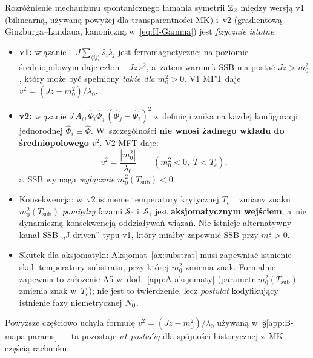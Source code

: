 \begin{remark}
\label{rem:B-ssb-v2}
Rozr\'o\.znienie mechanizmu spontanicznego \l{}amania symetrii
$\mathbb{Z}_2$ mi\k{e}dzy wersj\k{a} v1 (bilinearn\k{a}, u\.zywan\k{a}
powy\.zej dla transparentno\'sci MK) i~v2 (gradientow\k{a}
Ginzburga--Landaua, kanoniczn\k{a} w~\eqref{eq:H-Gamma}) jest
\emph{fizycznie istotne}:
\begin{itemize}[nosep]
  \item \textbf{v1:} wi\k{a}zanie $-J\sum_{\langle ij\rangle}
    \hat{s}_i\hat{s}_j$ jest ferromagnetyczne; na poziomie
    \'sredniopolowym daje cz\l{}on $-Jz\,s^2$, a~zatem warunek
    SSB ma posta\'c $Jz > m_0^2$, kt\'ory mo\.ze by\'c
    spe\l{}niony \emph{tak\.ze dla} $m_0^2 > 0$. V1 MFT
    daje $v^2 = (Jz - m_0^2)/\lambda_0$.
  \item \textbf{v2:} wi\k{a}zanie $J\,A_{ij}\,\hat{\Phi}_i
    \hat{\Phi}_j\,(\hat{\Phi}_j - \hat{\Phi}_i)^2$ z~defini\-cji
    znika na ka\.zdej konfiguracji jednorodnej $\hat{\Phi}_i
    \equiv \hat{\Phi}$. W~szczeg\'olno\'sci \textbf{nie wnosi
    \.zadnego wk\l{}adu do \'sredniopolowego $v^2$}. V2 MFT
    daje:
    \begin{equation}\label{eq:B-v2-vacuum}
      v^2 = \frac{|m_0^2|}{\lambda_0}
      \qquad (m_0^2 < 0,\; T < T_c),
    \end{equation}
    a~SSB wymaga \emph{wy\l{}\k{a}cznie} $m_0^2(T_{\mathrm{sub}})
    < 0$.
  \item Konsekwencja: w~v2 istnienie temperatury krytycznej
    $T_c$ i~zmiany znaku $m_0^2(T_{\mathrm{sub}})$ \emph{pomi\k{e}dzy}
    fazami $\mathcal{S}_0$ i~$\mathcal{S}_1$ jest \textbf{aksjo\-ma\-tycz\-nym
    wej\'sciem}, a~nie dynamiczn\k{a} konsekwencj\k{a} oddzia\-\l{}ywa\'n
    wi\k{a}za\'n. Nie istnieje alternatywny kana\l{} SSB
    ,,J-driven'' typu v1, kt\'ory mia\l{}by zapewni\'c SSB
    przy $m_0^2 > 0$.
  \item Skutek dla aksjomatyki: Aksjomat~\ref{ax:substrat} musi
    zapewnia\'c istnienie skali temperatury substratu, przy
    kt\'orej $m_0^2$ zmienia znak. Formalnie zapewnia to
    za\l{}o\.zenie A5 w~dod.~\ref{app:A-aksjomaty} (parametr
    $m_0^2(T_{\mathrm{sub}})$ zmienia znak w~$T_c$); nie jest
    to twierdzenie, lecz \emph{postulat} kodyfikuj\k{a}cy
    istnienie fazy niemetrycznej $N_0$.
\end{itemize}
Powy\.zsze cz\k{e}\'sciowo uchyla formu\l{}\k{e} $v^2
= (Jz - m_0^2)/\lambda_0$ u\.zywan\k{a} w~\S\ref{app:B-mapa-params}
--- ta pozostaje \emph{v1-posta\'ci\k{a}} dla sp\'ojno\'sci
historycznej z~MK cz\k{e}\'sci\k{a} rachunku.
\end{remark}

